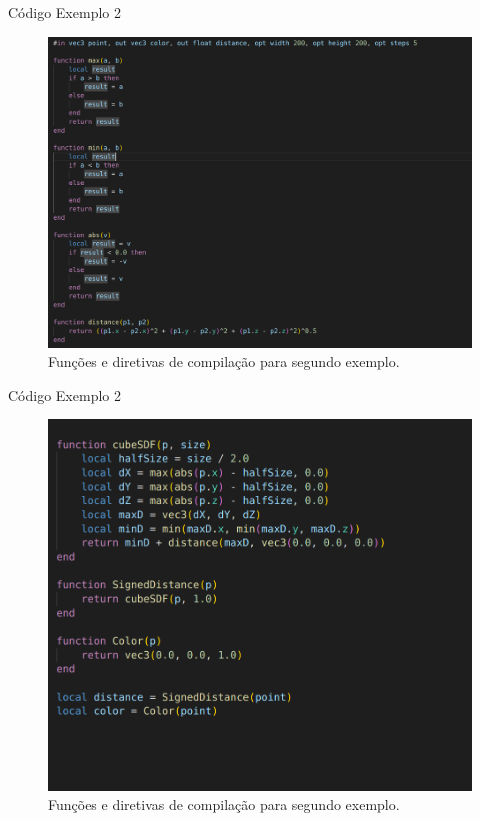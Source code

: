 \documentclass[2pt]{beamer} %
\begin{document}
\begin{frame}{Código Exemplo 2}


\begin{figure}
        \centering
        \includegraphics[width=0.7\linewidth]{imgs/cube1_code.png}
        \caption{Funções e diretivas de compilação para segundo exemplo.}
        \label{fig:enter-label}
    \end{figure}
\end{frame}

\begin{frame}{Código Exemplo 2}
\begin{figure}
    \centering
    \includegraphics[width=0.7\linewidth]{imgs/cube2_code.png}
    \caption{Funções e diretivas de compilação para segundo exemplo.}
    \label{fig:enter-label}
\end{figure}
\end{frame}
    
    
    
    
\end{document}
